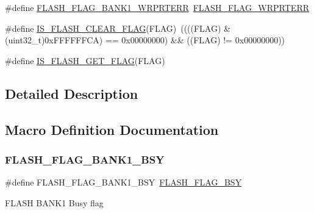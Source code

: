 \begin{DoxyCompactItemize}
\item 
\#define \mbox{\hyperlink{group___f_l_a_s_h___flags_ga1646345adbcda773ef25785b1bdc4c43}{F\+L\+A\+S\+H\+\_\+\+F\+L\+A\+G\+\_\+\+B\+A\+N\+K1\+\_\+\+W\+R\+P\+R\+T\+E\+RR}}~\mbox{\hyperlink{group___f_l_a_s_h___flags_ga5c59a7f07507cac38091275964d3d35d}{F\+L\+A\+S\+H\+\_\+\+F\+L\+A\+G\+\_\+\+W\+R\+P\+R\+T\+E\+RR}}
\item 
\#define \mbox{\hyperlink{group___f_l_a_s_h___flags_ga82f8c6104c348d6aa47c7658ed3b6b36}{I\+S\+\_\+\+F\+L\+A\+S\+H\+\_\+\+C\+L\+E\+A\+R\+\_\+\+F\+L\+AG}}(F\+L\+AG)~((((F\+L\+AG) \& (uint32\+\_\+t)0x\+F\+F\+F\+F\+F\+F\+C\+A) == 0x00000000) \&\& ((\+F\+L\+A\+G) != 0x00000000))
\item 
\#define \mbox{\hyperlink{group___f_l_a_s_h___flags_ga61b60325cd94e1608e34afc7aff20ee4}{I\+S\+\_\+\+F\+L\+A\+S\+H\+\_\+\+G\+E\+T\+\_\+\+F\+L\+AG}}(F\+L\+AG)
\end{DoxyCompactItemize}


\subsection{Detailed Description}


\subsection{Macro Definition Documentation}
\mbox{\label{group___f_l_a_s_h___flags_ga1f85e6d511503886e9fbe7d0228c97a4}} 
\subsubsection{\texorpdfstring{FLASH\_FLAG\_BANK1\_BSY}{FLASH\_FLAG\_BANK1\_BSY}}
{\footnotesize\ttfamily \#define F\+L\+A\+S\+H\+\_\+\+F\+L\+A\+G\+\_\+\+B\+A\+N\+K1\+\_\+\+B\+SY~\mbox{\hyperlink{group___f_l_a_s_h___flags_gad3bc368f954ad7744deda3315da2fff7}{F\+L\+A\+S\+H\+\_\+\+F\+L\+A\+G\+\_\+\+B\+SY}}}

F\+L\+A\+SH B\+A\+N\+K1 Busy flag \mbox{\label{group___f_l_a_s_h___flags_gafa7670ee5ce8a2eb1f64c458a9f08e5b}} 
